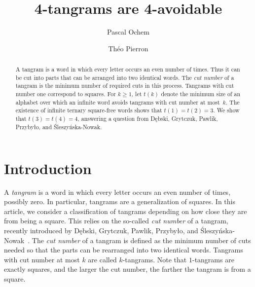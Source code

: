 \documentclass[final]{dmtcs-episciences}
\title{4-tangrams are 4-avoidable}
\author{Pascal Ochem\affiliationmark{1} \and Th\'eo Pierron\affiliationmark{2}}
\affiliation{
  LIRMM, CNRS, Universit\'e de Montpellier, Montpellier, France.\\
  Univ Lyon, UCBL, CNRS, INSA Lyon, LIRIS, Lyon, France.}
\renewcommand{\ge}{\geqslant}
\theoremstyle{plain}
\theoremstyle{definition}
\theoremstyle{remark}
\begin{document}

\maketitle

\vspace{0mm}

\begin{abstract}
A tangram is a word in which every letter occurs an even number of times.
Thus it can be cut into parts that can be arranged into two identical words.
The \emph{cut number} of a tangram is the minimum number of required cuts in this process.
Tangrams with cut number one correspond to squares.
For $k\ge1$, let $t(k)$ denote the minimum size of an alphabet over which an infinite word 
avoids tangrams with cut number at most~$k$.
The existence of infinite ternary square-free words shows that $t(1)=t(2)=3$.
We show that $t(3)=t(4)=4$, answering a question from D\k{e}bski, Grytczuk, Pawlik, Przyby\l{}o, and \'Sleszy\'nska-Nowak.
\end{abstract}

\section{Introduction}\label{sec:intro}
A \emph{tangram} is a word in which every letter occurs an even number of times, possibly zero.
In particular, tangrams are a generalization of squares.
In this article, we consider a classification of tangrams depending on how close they are from being a square.
This relies on the so-called \emph{cut number} of a tangram, recently introduced by D\k{e}bski, Grytczuk, Pawlik, Przyby\l{}o, and \'Sleszy\'nska-Nowak~\cite{Debski(2024)}.
The \emph{cut number} of a tangram is defined as the minimum number of cuts needed so that the parts can be rearranged into two identical words.
Tangrams with cut number at most $k$ are called $k$-tangrams. Note that $1$-tangrams are exactly squares, and the larger the cut number, the farther the tangram is from a square.
\end{document}
